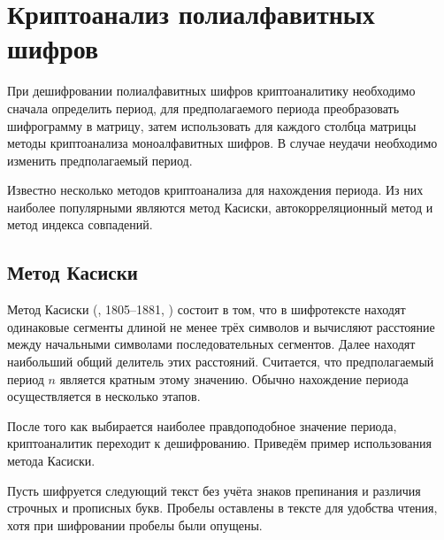 \section[Криптоанализ полиалфавитных шифров]{Криптоанализ полиалфавитных \protect\\ шифров}

При дешифровании полиалфавитных шифров криптоаналитику необходимо сначала определить период, для предполагаемого периода преобразовать шифрограмму в матрицу, затем использовать для каждого столбца матрицы методы криптоанализа моноалфавитных шифров. В случае неудачи необходимо изменить предполагаемый период.

Известно несколько методов криптоанализа для нахождения периода. Из них наиболее популярными являются метод Касиски, автокорреляционный метод и метод индекса совпадений.


\subsection{Метод Касиски}

Метод Касиски (, 1805--1881, \cite{Kasiski:1863}) состоит в том, что в шифротексте находят одинаковые сегменты длиной не менее трёх символов и вычисляют расстояние между начальными символами последовательных сегментов. Далее находят наибольший общий делитель этих расстояний. Считается, что предполагаемый период $n$ является кратным этому значению. Обычно нахождение периода осуществляется в несколько этапов.

После того как выбирается наиболее правдоподобное значение периода, криптоаналитик переходит к дешифрованию. Приведём пример использования метода Касиски.

\example
Пусть шифруется следующий текст без учёта знаков препинания и различия строчных и прописных букв. Пробелы оставлены в тексте для удобства чтения, хотя при шифровании пробелы были опущены.

